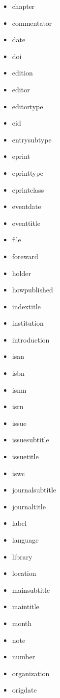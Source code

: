 \documentclass{article}
\begin{document}
\begin{itemize}
\begin{multicols}{4}
\begin{itemize}
        \item chapter
        \item commentator
        \item date
        \item doi
        \item edition
        \item editor
        \item editortype
        \item eid
        \item entrysubtype
        \item eprint
        \item eprinttype
        \item eprintclass
        \item eventdate
        \item eventtitle
        \item file
        \item foreward
        \item holder
        \item howpublished
        \item indextitle
        \item institution
        \item introduction
        \item isan
        \item isbn
        \item ismn
        \item isrn
        \item issue
        \item issuesubtitle
        \item issuetitle
        \item iswc
        \item journalsubtitle
        \item journaltitle
        \item label
        \item language
        \item library
        \item location
        \item mainsubtitle
        \item maintitle
        \item month
        \item note
        \item number
        \item organization
        \item origdate

\end{itemize}
\end{multicols}
\end{itemize}
\end{document}
